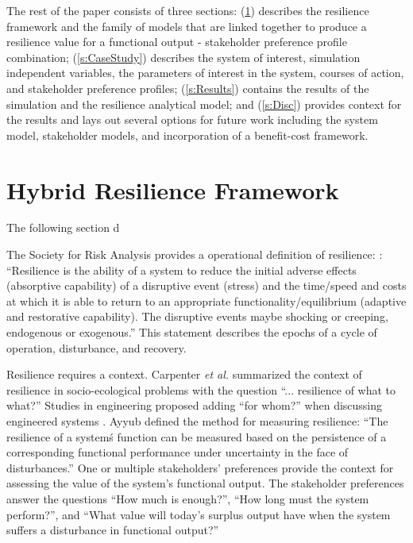 \documentclass[preprint,12pt]{elsarticle}
\begin{document}
The rest of the paper consists of three sections: 
(\ref{s:HRF}) describes the
resilience framework and the family of models that are linked
together to produce a resilience value for a functional output -
stakeholder preference profile combination; (\ref{s:CaseStudy})
describes the system of interest, simulation independent variables, the parameters of
interest in the system, courses of action, and stakeholder preference
profiles; (\ref{s:Results}) contains the results of the 
simulation and the resilience analytical model; and (\ref{s:Disc})
provides context for the results and lays out several options for
future work including the system model, stakeholder
models, and incorporation of a benefit-cost framework. 




\section{Hybrid Resilience Framework}
\label{s:HRF}

The following section d

The Society for Risk Analysis provides a operational definition of
resilience: \cite{SRA2016}: ``Resilience is the ability of a system to
reduce the initial adverse effects (absorptive capability) of a
disruptive event (stress) and the time/speed and costs at which it
is able to return to an appropriate functionality/equilibrium
(adaptive and restorative capability). The disruptive events maybe
shocking or creeping, endogenous or exogenous.'' This statement
describes the epochs of a cycle of operation, disturbance, and
recovery.

Resilience requires a context. Carpenter \emph{et al.}
\cite{Carpenter2001} summarized the context of resilience in
socio-ecological problems with the question ``... resilience of what
to what?''  Studies in engineering proposed adding ``for whom?'' when
discussing engineered systems \cite{Emanuel2017,Emanuel2018}. 
Ayyub \cite{Ayyub2014a} defined the method for measuring
resilience: ``The resilience of a system\'s function can be measured
based on the persistence of a corresponding functional performance
under uncertainty in the face of disturbances.'' One or multiple
stakeholders' preferences provide the context for assessing the value
of the system's functional output. The stakeholder preferences answer
the questions ``How much is enough?'', ``How long must the system
perform?'', and ``What value will today's surplus output have when the
system suffers a disturbance in functional output?''
\cite{Emanuel2017,Emanuel2018} 
\end{document}
